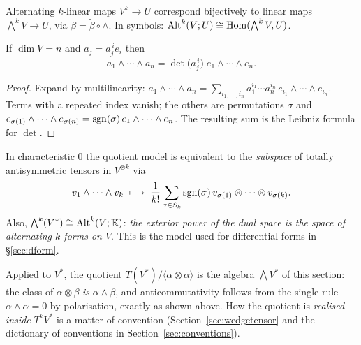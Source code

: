 \begin{theorem}\label{thm:extuniv}
Alternating $k$-linear maps $V^k\to U$ correspond bijectively to linear maps $\bigwedge^kV\to U$,
via $\beta=\tilde\beta\circ\wedge$. In symbols: $\mathrm{Alt}^k(V;U)\cong\mathrm{Hom}(\bigwedge^kV,U)$.
\end{theorem}

\begin{corollary}[Determinant]\label{cor:det}
If $\dim V=n$ and $a_j=a_j^{\,i}e_i$ then
\[
 a_1\wedge\cdots\wedge a_n=\det\bigl(a_j^{\,i}\bigr)\;e_1\wedge\cdots\wedge e_n .
\]
\end{corollary}
\begin{proof}
Expand by multilinearity: $a_1\wedge\cdots\wedge a_n=\sum_{i_1,\dots,i_n}a_1^{i_1}\cdots a_n^{i_n}\,e_{i_1}\wedge\cdots\wedge e_{i_n}$.
Terms with a repeated index vanish; the others are permutations $\sigma$ and $e_{\sigma(1)}\wedge\cdots\wedge e_{\sigma(n)}=\mathrm{sgn}(\sigma)\,e_1\wedge\cdots\wedge e_n$. The resulting sum is the Leibniz formula for $\det$.
\end{proof}

\begin{remark}\label{rem:twomodels}
In characteristic $0$ the quotient model is equivalent to the \emph{subspace} of totally antisymmetric tensors in $V^{\otimes k}$ via
\[
 v_1\wedge\cdots\wedge v_k\;\longmapsto\;\frac1{k!}\sum_{\sigma\in S_k}\mathrm{sgn}(\sigma)\,v_{\sigma(1)}\otimes\cdots\otimes v_{\sigma(k)} .
\]
Also, $\bigwedge^k(V^*)\cong\mathrm{Alt}^k(V;\mathbb{K})$: \emph{the exterior power of the dual space is the space of alternating $k$-forms on $V$}. This is the model used for differential forms in \S\ref{sec:dform}.
\end{remark}


\begin{remark}\label{rem:normalisation}
Applied to $V^*$, the quotient $T(V^*)/\langle\alpha\otimes\alpha\rangle$ is the algebra $\bigwedge V^*$ of this section: the
class of $\alpha\otimes\beta$ \emph{is} $\alpha\wedge\beta$, and anticommutativity follows from the single rule $\alpha\wedge\alpha=0$ by
polarisation, exactly as shown above. How the quotient is \emph{realised inside} $T^kV^*$ is a matter of convention
(Section~\ref{sec:wedgetensor} and the dictionary of conventions in Section~\ref{sec:conventions}).
\end{remark}
